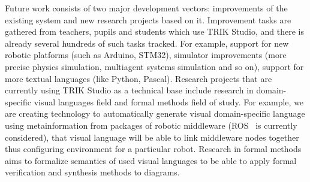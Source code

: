 \documentclass[conference]{IEEEtran}
\begin{document}
Future work consists of two major development vectors: improvements of the existing system and new research projects based on it. Improvement tasks are gathered from teachers, pupils and students which use TRIK Studio, and there is already several hundreds of such tasks tracked. For example, support for new robotic platforms (such as Arduino, STM32), simulator improvements (more precise physics simulation, multiagent systems simulation and so on), support for more textual languages (like Python, Pascal). Research projects that are currently using TRIK Studio as a technical base include research in domain-specific visual languages field and formal methods field of study. For example, we are creating technology to automatically generate visual domain-specific language using metainformation from packages of robotic middleware (ROS~\cite{quigley2009ros} is currently considered), that visual language will be able to link middleware nodes together thus configuring environment for a particular robot. Research in formal methods aims to formalize semantics of used visual languages to be able to apply formal verification and synthesis methods to diagrams.



\end{document}
